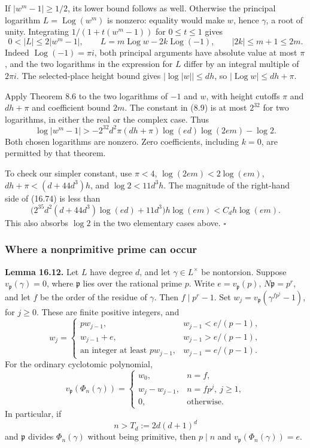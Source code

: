 \documentclass[
  11pt,
  a4paper,
]{article}
\begin{document}
If \(|w^m-1|\ge1/2\), its lower bound follows as well. Otherwise the
principal logarithm \(L=\operatorname{Log}(w^m)\) is nonzero: equality
would make \(w\), hence \(\gamma\), a root of unity. Integrating
\(1/(1+t(w^m-1))\) for \(0\le t\le1\) gives \[
 0<|L|\le2|w^m-1|,\qquad
 L=m\operatorname{Log}w-2k\operatorname{Log}(-1),\qquad
 |2k|\le m+1\le2m.
 \tag{16.73}
\] Indeed \(\operatorname{Log}(-1)=\pi i\), both principal arguments
have absolute value at most \(\pi\), and the two logarithms in the
expression for \(L\) differ by an integral multiple of \(2\pi i\). The
selected-place height bound gives \(|\log|w||\le dh\), so
\(|\operatorname{Log}w|\le dh+\pi\).

Apply Theorem 8.6 to the two logarithms of \(-1\) and \(w\), with height
cutoffs \(\pi\) and \(dh+\pi\) and coefficient bound \(2m\). The
constant in (8.9) is at most \(2^{32}\) for two logarithms, in either
the real or the complex case. Thus \[
 \log|w^m-1|>
 -2^{32}d^2\pi(dh+\pi)\log(ed)\log(2em)-\log2.
 \tag{16.74}
\] Both chosen logarithms are nonzero. Zero coefficients, including
\(k=0\), are permitted by that theorem.

To check our simpler constant, use \(\pi<4\), \(\log(2em)<2\log(em)\),
\(dh+\pi<(d+44d^3)h\), and \(\log2<11d^3h\). The magnitude of the
right-hand side of (16.74) is less than \[
 \bigl(2^{35}d^2(d+44d^3)\log(ed)+11d^3\bigr)h\log(em)
 <C_dh\log(em).
\] This also absorbs \(\log2\) in the two elementary cases above.
\(\square\)

\subsubsection{Where a nonprimitive prime can
occur}\label{where-a-nonprimitive-prime-can-occur}

\textbf{Lemma 16.12.} Let \(L\) have degree \(d\), and let
\(\gamma\in L^\times\) be nontorsion. Suppose
\(v_{\mathfrak p}(\gamma)=0\), where \(\mathfrak p\) lies over the
rational prime \(p\). Write \(e=v_{\mathfrak p}(p)\),
\(N\mathfrak p=p^r\), and let \(f\) be the order of the residue of
\(\gamma\). Then \(f\mid p^r-1\). Set
\(w_j=v_{\mathfrak p}(\gamma^{fp^j}-1)\), for \(j\ge0\). These are
finite positive integers, and \[
 w_j=
 \begin{cases}
 pw_{j-1},&w_{j-1}<e/(p-1),\\
 w_{j-1}+e,&w_{j-1}>e/(p-1),\\
 \text{an integer at least }pw_{j-1},&w_{j-1}=e/(p-1).
 \end{cases}
 \tag{16.75}
\] For the ordinary cyclotomic polynomial, \[
 v_{\mathfrak p}(\Phi_n(\gamma))=
 \begin{cases}
 w_0,&n=f,\\
 w_j-w_{j-1},&n=fp^j,\ j\ge1,\\
 0,&\text{otherwise}.
 \end{cases}
 \tag{16.76}
\] In particular, if \[
 n>T_d:=2d(d+1)^d
 \tag{16.77}
\] and \(\mathfrak p\) divides \(\Phi_n(\gamma)\) without being
primitive, then \(p\mid n\) and \(v_{\mathfrak p}(\Phi_n(\gamma))=e\).
\end{document}
